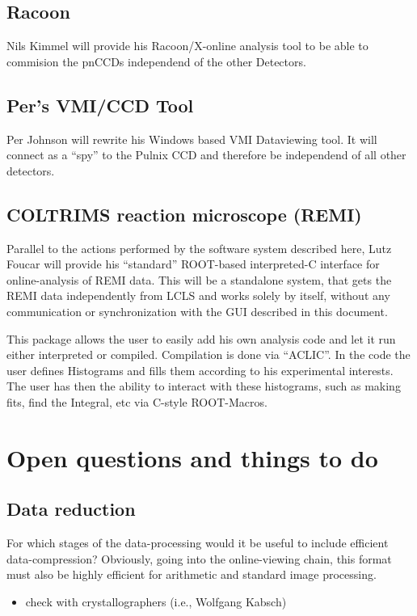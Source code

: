 \documentclass[11pt,a4paper,oneside]{article}
\begin{document}
\subsection{Racoon}
\label{sec:additional_racoon}

Nils Kimmel will provide his Racoon/X-online analysis tool to be able to commision the pnCCDs independend of the other Detectors.

\subsection{Per's VMI/CCD Tool}
\label{sec:pervmi}

Per Johnson will rewrite his Windows based VMI Dataviewing tool. It will connect as a "`spy"' to the Pulnix CCD and therefore be independend of all other detectors. 

\subsection{COLTRIMS reaction microscope (REMI)}
\label{sec:remi}

Parallel to the actions performed by the software system described here, Lutz Foucar will provide his ``standard'' ROOT-based interpreted-C interface for online-analysis of REMI data. This will be a standalone system, that gets the REMI data independently from LCLS and works solely by itself, without any communication or synchronization with the GUI described in this document.

This package allows the user to easily add his own analysis code and let it run either interpreted or compiled. Compilation is done via ``ACLIC''. In the code the user defines Histograms and fills them according to his experimental interests. The user has then the ability to interact with these histograms, such as making fits, find the Integral, etc via C-style ROOT-Macros.

\clearpage

\section{Open questions and things to do}
\label{sec:open-quest-things}

\subsection{Data reduction}
\label{sec:data-reduction}

For which stages of the data-processing would it be useful to include efficient data-compression?
Obviously, going into the online-viewing chain, this format must also be highly efficient for
arithmetic and standard image processing.
\begin{itemize}
\item check with crystallographers (i.e., Wolfgang Kabsch)
\end{itemize}
\end{document}
